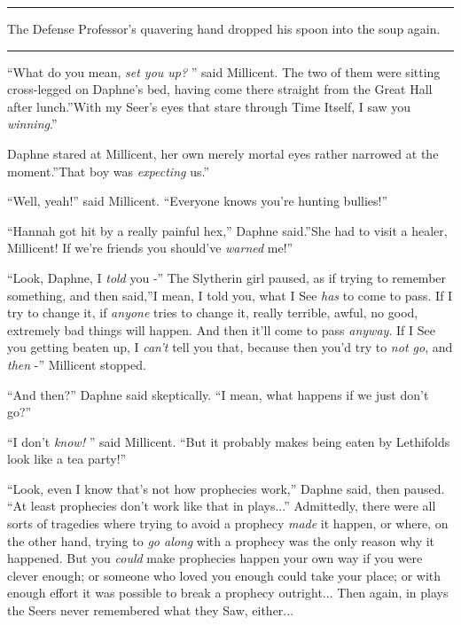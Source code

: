 \begin{center}\rule{3in}{0.4pt}\end{center}

The Defense Professor's quavering hand dropped his spoon into the soup
again.

\begin{center}\rule{3in}{0.4pt}\end{center}

``What do you mean, \emph{set you up?} '' said Millicent. The two of them
were sitting cross-legged on Daphne's bed, having come there straight
from the Great Hall after lunch.''With my Seer's eyes that stare through
Time Itself, I saw you \emph{winning}.''

Daphne stared at Millicent, her own merely mortal eyes rather narrowed
at the moment.''That boy was \emph{expecting} us.''

``Well, yeah!'' said Millicent. ``Everyone knows you're hunting
bullies!''

``Hannah got hit by a really painful hex,'' Daphne said.''She had to
visit a healer, Millicent! If we're friends you should've \emph{warned}
me!''

``Look, Daphne, I \emph{told} you -'' The Slytherin girl paused, as if
trying to remember something, and then said,''I mean, I told you, what I
See \emph{has} to come to pass. If I try to change it, if \emph{anyone}
tries to change it, really terrible, awful, no good, extremely bad
things will happen. And then it'll come to pass \emph{anyway}. If I See
you getting beaten up, I \emph{can't} tell you that, because then you'd
try to \emph{not go}, and \emph{then} -'' Millicent stopped.

``And then?'' Daphne said skeptically. ``I mean, what happens if we just
don't go?''

``I don't \emph{know!} '' said Millicent. ``But it probably makes being
eaten by Lethifolds look like a tea party!''

``Look, even I know that's not how prophecies work,'' Daphne said, then
paused. ``At least prophecies don't work like that in plays...''
Admittedly, there were all sorts of tragedies where trying to avoid a
prophecy \emph{made} it happen, or where, on the other hand, trying to
\emph{go along} with a prophecy was the only reason why it happened. But
you \emph{could} make prophecies happen your own way if you were clever
enough; or someone who loved you enough could take your place; or with
enough effort it was possible to break a prophecy outright... Then
again, in plays the Seers never remembered what they Saw, either...

